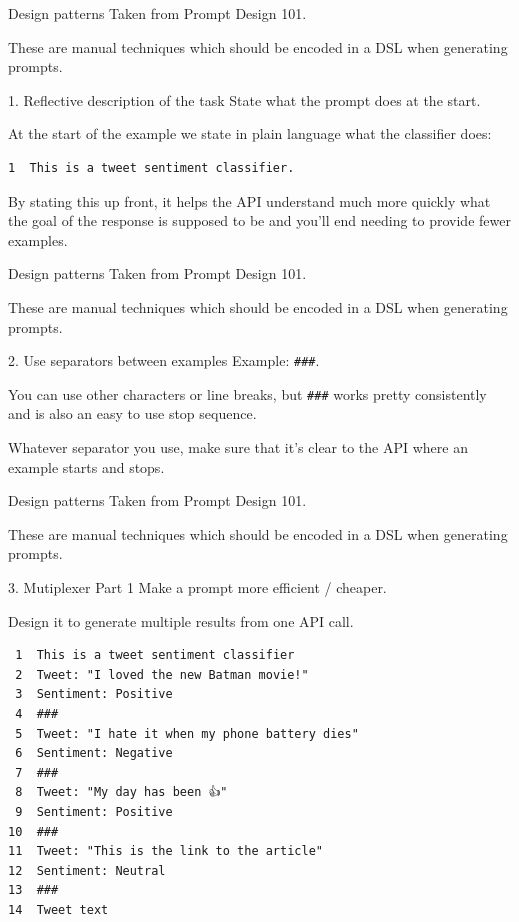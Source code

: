 \documentclass[presentation]{beamer}
\begin{document}
\begin{frame}[label={sec:org45e9c32},fragile]{Design patterns}
 Taken from Prompt Design 101.

These are manual techniques which should be
encoded in a DSL when generating prompts.

\begin{block}{1. Reflective description of the task}
State what the prompt does at the start.

At the start of the example we state in plain
language what the classifier does:

\begin{verbatim}
1  This is a tweet sentiment classifier.
\end{verbatim}

By stating this up front, it helps the API
understand much more quickly what the goal of
the response is supposed to be and you’ll end
needing to provide fewer examples.
\end{block}
\end{frame}

\begin{frame}[label={sec:org3e646a6},fragile]{Design patterns}
 Taken from Prompt Design 101.

These are manual techniques which should be
encoded in a DSL when generating prompts.

\begin{block}{2. Use separators between examples}
Example: \texttt{\#\#\#}.

You can use other characters or line breaks,
but \texttt{\#\#\#} works pretty consistently and is
also an easy to use stop sequence.

Whatever separator you use, make sure that
it’s clear to the API where an example starts
and stops.
\end{block}
\end{frame}

\begin{frame}[label={sec:orge845bb0},fragile]{Design patterns}
 Taken from Prompt Design 101.

These are manual techniques which should be
encoded in a DSL when generating prompts.

\begin{block}{3. Mutiplexer Part 1}
Make a prompt more efficient / cheaper.

Design it to generate multiple results from
one API call.

{\tiny
\begin{verbatim}
 1  This is a tweet sentiment classifier
 2  Tweet: "I loved the new Batman movie!"
 3  Sentiment: Positive
 4  ###
 5  Tweet: "I hate it when my phone battery dies"
 6  Sentiment: Negative
 7  ###
 8  Tweet: "My day has been 👍"
 9  Sentiment: Positive
10  ###
11  Tweet: "This is the link to the article"
12  Sentiment: Neutral
13  ###
14  Tweet text
\end{verbatim}

}
\end{block}
\end{frame}
\end{document}
